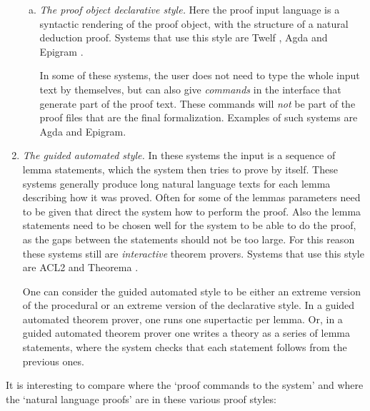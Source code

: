 \documentclass{LMCS}
\begin{document}
\begin{enumerate}[(1)]
\begin{enumerate}[(a)]
\item
\emph{The proof object declarative style.}
\label{item:declarative:object}
Here the proof input language is a syntactic rendering of the proof object,
with the structure of a natural deduction proof.
Systems that use this style are
Twelf \cite{pfe:sch:02}, Agda \cite{agd:xx} and Epigram \cite{mcb:mck:04}.

In some of these systems, the user does not need to type the whole
input text by themselves, but can also give \emph{commands} in the interface that generate part of the proof text.
These commands will \emph{not} be part of the proof files that
are the final formalization.
Examples of such systems are Agda and Epigram.

\end{enumerate}
\smallskip

\item
\emph{The guided automated style.}
\label{item:guidedautomated}
In these systems the input is a sequence of lemma statements,
which the system then tries to prove by itself.
These systems generally produce long
natural language texts for each lemma describing how it was proved.
Often for some of the lemmas parameters need to be given that
direct the system how to perform the proof.
Also the lemma statements need to be chosen well for the system
to be able to do the proof, as the gaps between the statements should not
be too large.
For this reason these systems still
are \emph{interactive} theorem provers.
Systems that use this style are ACL2 \cite{kau:man:moo:00} and Theorema \cite{buc:jeb:kri:mar:vas:97}.

One can consider the guided automated style to be either an extreme version
of the procedural or an extreme version of the declarative style.
In a guided automated theorem prover, one runs one supertactic per
lemma.
Or, in a guided automated theorem prover one
writes a theory as a series of lemma statements, where the
system checks that each statement follows from the previous ones.

\end{enumerate}

\noindent
It is interesting to compare where the `proof commands to the system' and where the
`natural language proofs' are in these various proof styles:
\end{document}
